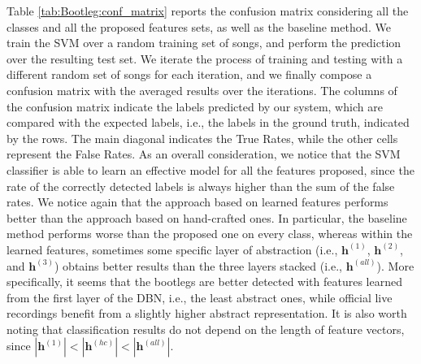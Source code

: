 Table \ref{tab:Bootleg:conf_matrix} reports the confusion matrix considering all the classes and all the proposed features sets, as well as the baseline method. We train the SVM over a random training set of songs, and perform the prediction over the resulting test set. We iterate the process of training and testing with a different random set of songs for each iteration, and we finally compose a confusion matrix with the averaged results over the iterations. The columns of the confusion matrix indicate the labels predicted by our system, which are compared with the expected labels, i.e., the labels in the ground truth, indicated by the rows. The main diagonal indicates the True Rates, while the other cells represent the False Rates. As an overall consideration, we notice that the SVM classifier is able to learn an effective model for all the features proposed, since the rate of the correctly detected labels is always higher than the sum of the false rates. 
We notice again that the approach based on learned features performs better than the approach based on hand-crafted ones. In particular, the baseline method performs worse than the proposed one on every class, whereas within the learned features, sometimes some specific layer of abstraction (i.e., $\mathbf{h}^{(1)}$, $\mathbf{h}^{(2)}$, and $\mathbf{h}^{(3)}$) obtains better results than the three layers stacked (i.e., $\mathbf{h}^{(all)}$). More specifically, it seems that the bootlegs are better detected with features learned from the first layer of the DBN, i.e., the least abstract ones, while official live recordings benefit from a slightly higher abstract representation. It is also worth noting that classification results do not depend on the length of feature vectors, since $|\mathbf{h}^{(1)}| < |\mathbf{h}^{(hc)}| < |\mathbf{h}^{(all)}|$.


